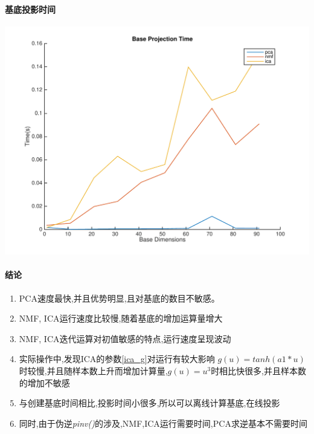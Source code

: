 \paragraph{基底投影时间}
\begin{center}
\begin{minipage}[t]{\linewidth}
\center
{
\includegraphics[width=\MyFactor\textwidth]{Img/pni_baseproj} 
\label{fig:ica_base}
}
\end{minipage}
\medskip
\end{center}

\paragraph{结论}
\begin{enumerate}
	\item PCA速度最快,并且优势明显,且对基底的数目不敏感。
	\item NMF, ICA运行速度比较慢,随着基底的增加运算量增大
	\item NMF, ICA迭代运算对初值敏感的特点,运行速度呈现波动
	\item 实际操作中,发现ICA的参数\ref{ica_g}对运行有较大影响
		$g(u)=tanh(a1*u)$时较慢,并且随样本数上升而增加计算量,$g(u) = u^3$时相比快很多,并且样本数的增加不敏感
	\item 与创建基底时间相比,投影时间小很多,所以可以离线计算基底,在线投影
	\item 同时,由于伪逆\textit{pinv()}的涉及,NMF,ICA运行需要时间,PCA求逆基本不需要时间
\end{enumerate}



